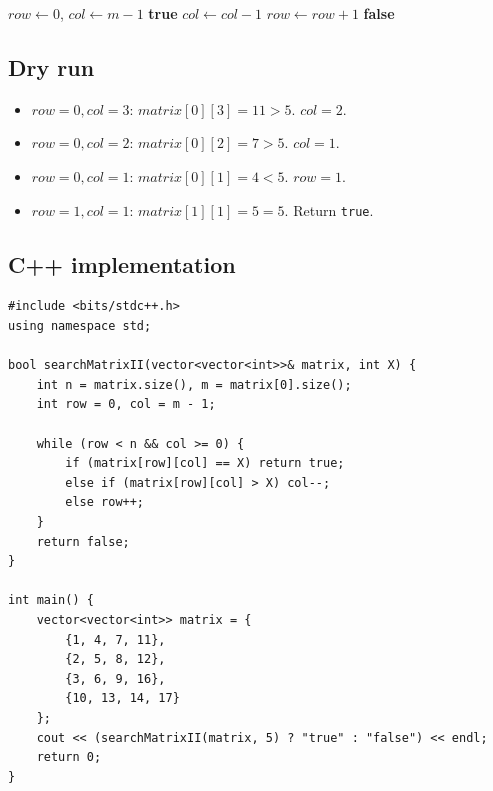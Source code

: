 \begin{algorithm}[H]
\caption{Search in a 2D Matrix II (Staircase Search)}
\begin{algorithmic}[1]
  \State $\textit{row} \gets 0$, $\textit{col} \gets m-1$
     \Return \textbf{true} \EndIf
      \State $\textit{col} \gets \textit{col} - 1$
    \Else
      \State $\textit{row} \gets \textit{row} + 1$
    \EndIf
  \EndWhile
  \State \Return \textbf{false}
\EndProcedure
\end{algorithmic}
\end{algorithm}

\subsection*{Dry run}


\begin{itemize}
  \item $\textit{row}=0,\textit{col}=3$: $\textit{matrix}[0][3]=11 > 5$.
        $\textit{col}=2$.
  \item $\textit{row}=0,\textit{col}=2$: $\textit{matrix}[0][2]=7 > 5$.
        $\textit{col}=1$.
  \item $\textit{row}=0,\textit{col}=1$: $\textit{matrix}[0][1]=4 < 5$.
        $\textit{row}=1$.
  \item $\textit{row}=1,\textit{col}=1$: $\textit{matrix}[1][1]=5 = 5$.
        Return \texttt{true}.
\end{itemize}

\subsection*{C++ implementation}

\begin{lstlisting}
#include <bits/stdc++.h>
using namespace std;

bool searchMatrixII(vector<vector<int>>& matrix, int X) {
    int n = matrix.size(), m = matrix[0].size();
    int row = 0, col = m - 1;

    while (row < n && col >= 0) {
        if (matrix[row][col] == X) return true;
        else if (matrix[row][col] > X) col--;
        else row++;
    }
    return false;
}

int main() {
    vector<vector<int>> matrix = {
        {1, 4, 7, 11},
        {2, 5, 8, 12},
        {3, 6, 9, 16},
        {10, 13, 14, 17}
    };
    cout << (searchMatrixII(matrix, 5) ? "true" : "false") << endl;
    return 0;
}
\end{lstlisting}

